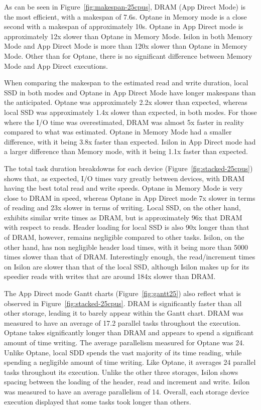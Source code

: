 \documentclass[conference]{IEEEtran}
\begin{document}
As can be seen in Figure~\ref{fig:makespan-25cpus}, DRAM (App Direct Mode) is the 
most efficient, with a makespan of 7.6s. Optane in Memory mode is a close second
with a makespan of approximately 10s. Optane in App Direct mode is approximately 
12x slower than Optane in Memory Mode. Isilon in both Memory Mode and App Direct 
Mode is more than 120x slower than Optane in Memory Mode. Other than for Optane, 
there is no significant difference between Memory Mode and App Direct executions.

When comparing the makespan to the estimated read and write duration, local SSD
in both modes and Optane in App Direct Mode have longer makespans than the anticipated.
Optane was approximately 2.2x slower than expected, whereas local SSD was approximately
1.4x slower than expected, in both modes. For those where the I/O time was overestimated,
DRAM was almost 5x faster in reality compared to what was estimated. Optane in Memory Mode
had a smaller difference, with it being 3.8x faster than expected. Isilon in App Direct
mode had a larger difference than Memory mode, with it being 1.1x faster than expected.


The total task duration breakdowns for each device (Figure~\ref{fig:stacked-25cpus})
shows that, as expected, I/O times vary greatly between devices, with DRAM having the
best total read and write speeds. Optane in Memory Mode is very close to DRAM in speed,
whereas Optane in App Direct mode 7x slower in terms of reading and 23x slower in terms
of writing. Local SSD, on the other hand, exhibits similar write times as DRAM, but is
approximately 96x that DRAM with respect to reads. Header loading for local SSD is also 90x longer
than that of DRAM, however, remains negligible compared to other tasks. Isilon, on the 
other hand, has non negligible header load times, with it being more than 5000 times
slower than that of DRAM. Interestingly enough, the read/increment times on Isilon are
slower than that of the local SSD, although Isilon makes up for its speedier reads with 
writes that are around 184x slower than DRAM.


The App Direct mode Gantt charts (Figure~\ref{fig:gantt25}) also reflect what is observed in Figure~\ref{fig:stacked-25cpus}.
DRAM is significantly faster than all other storage, leading it to barely appear within the Gantt chart.
DRAM was measured to have an average of 17.2 parallel tasks throughout the execution. Optane takes
significantly longer than DRAM and appears to spend a significant amount of time writing. The average
parallelism measured for Optane was 24. Unlike Optane, local SDD spends the vast majority of its time
reading, while spending a negligible amount of time writing. Like Optane, it averages 24 parallel tasks
throughout its execution. Unlike the other three storages, Isilon shows spacing between the loading of the header,
read and increment and write. Isilon was measured to have an average parallelism of 14. Overall, each storage device
execution displayed that some tasks took longer than others.
\end{document}

